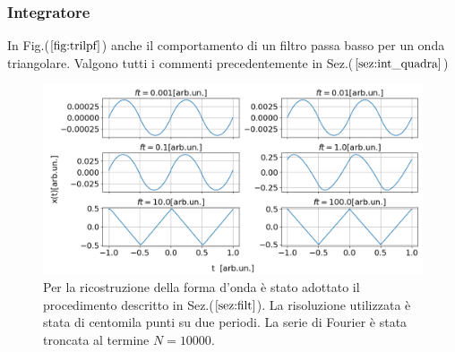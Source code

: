 \documentclass{article}
\begin{document}
        \subsubsection{Integratore}
            
            In Fig.($\ref{fig:trilpf}$) anche il comportamento di un filtro passa
            basso per un onda triangolare. Valgono tutti i commenti precedentemente in 
            Sez.($\ref{sez:int_quadra}$)
            \begin{figure}[H]
                \centering
                \includegraphics[width=1\textwidth]{integ_trian.png} %
                \caption{Per la ricostruzione della forma d'onda è stato adottato 
                il procedimento descritto in Sez.($\ref{sez:filt}$).
                La risoluzione utilizzata è stata di centomila punti su due periodi.
                La serie di Fourier è stata troncata al termine $N=10000$.}
                \label{fig:trilpf}
            \end{figure}
\end{document}
